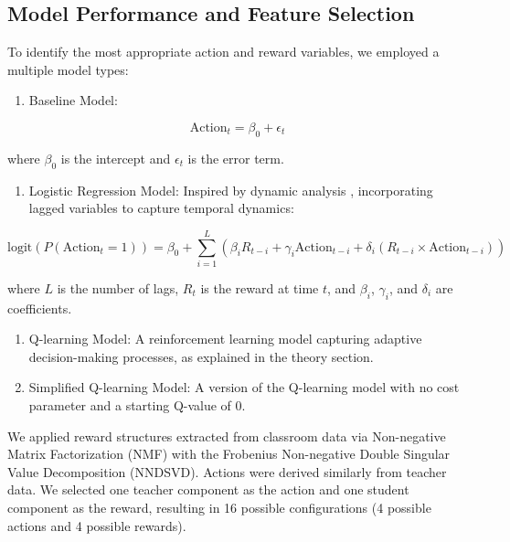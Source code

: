 \documentclass[
  number,
  preprint,
  3p,
  onecolumn]{elsarticle}
\providecommand{\tightlist}{%
  \setlength{\itemsep}{0pt}\setlength{\parskip}{0pt}}\usepackage{longtable,booktabs,array}
\begin{document}
\subsection{Model Performance and Feature
Selection}\label{model-performance-and-feature-selection}

To identify the most appropriate action and reward variables, we
employed a multiple model types:

\begin{enumerate}
\def\labelenumi{\arabic{enumi}.}
\tightlist
\item
  Baseline Model:
\end{enumerate}

\[
\text{Action}_t = \beta_0 + \epsilon_t
\]

where \(\beta_0\) is the intercept and \(\epsilon_t\) is the error term.

\begin{enumerate}
\def\labelenumi{\arabic{enumi}.}
\setcounter{enumi}{1}
\tightlist
\item
  Logistic Regression Model: Inspired by dynamic analysis
  \citep{lau2005}, incorporating lagged variables to capture temporal
  dynamics:
\end{enumerate}

\[
\text{logit}(P(\text{Action}_t = 1)) = \beta_0 + \sum_{i=1}^{L} (\beta_i R_{t-i} + \gamma_i \text{Action}_{t-i} + \delta_i (R_{t-i} \times \text{Action}_{t-i}))
\]

where \(L\) is the number of lags, \(R_t\) is the reward at time \(t\),
and \(\beta_i\), \(\gamma_i\), and \(\delta_i\) are coefficients.

\begin{enumerate}
\def\labelenumi{\arabic{enumi}.}
\setcounter{enumi}{2}
\item
  Q-learning Model: A reinforcement learning model capturing adaptive
  decision-making processes, as explained in the theory section.
\item
  Simplified Q-learning Model: A version of the Q-learning model with no
  cost parameter and a starting Q-value of 0.
\end{enumerate}

We applied reward structures extracted from classroom data via
Non-negative Matrix Factorization (NMF) with the Frobenius Non-negative
Double Singular Value Decomposition (NNDSVD). Actions were derived
similarly from teacher data. We selected one teacher component as the
action and one student component as the reward, resulting in 16 possible
configurations (4 possible actions and 4 possible rewards).
\end{document}
